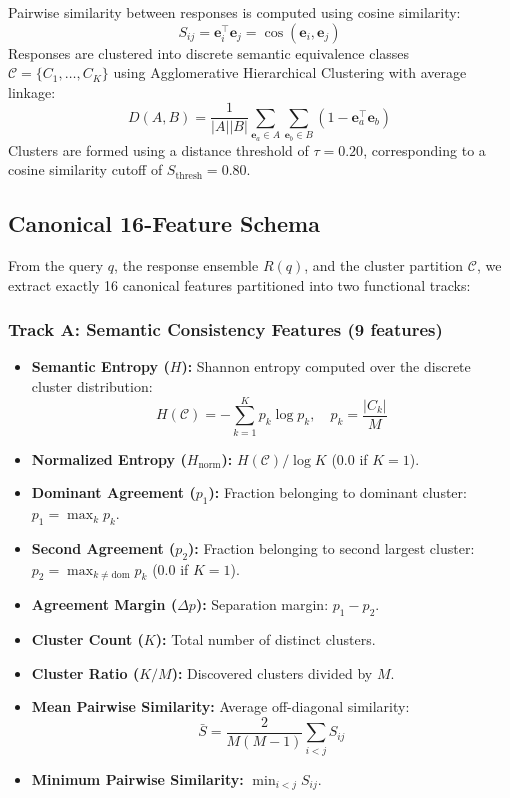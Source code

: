 \documentclass[conference]{IEEEtran}
\begin{document}
Pairwise similarity between responses is computed using cosine similarity:
\begin{equation}
S_{ij} = \mathbf{e}_i^\top \mathbf{e}_j = \cos(\mathbf{e}_i, \mathbf{e}_j)
\end{equation}
Responses are clustered into discrete semantic equivalence classes $\mathcal{C} = \{C_1, \dots, C_K\}$ using Agglomerative Hierarchical Clustering with average linkage:
\begin{equation}
D(A, B) = \frac{1}{|A||B|} \sum_{\mathbf{e}_a \in A} \sum_{\mathbf{e}_b \in B} (1 - \mathbf{e}_a^\top \mathbf{e}_b)
\end{equation}
Clusters are formed using a distance threshold of $\tau = 0.20$, corresponding to a cosine similarity cutoff of $S_{\text{thresh}} = 0.80$.

\subsection{Canonical 16-Feature Schema}
From the query $q$, the response ensemble $R(q)$, and the cluster partition $\mathcal{C}$, we extract exactly 16 canonical features partitioned into two functional tracks:

\subsubsection{Track A: Semantic Consistency Features (9 features)}
\begin{itemize}
    \item \textbf{Semantic Entropy ($H$):} Shannon entropy computed over the discrete cluster distribution:
    \begin{equation}
    H(\mathcal{C}) = -\sum_{k=1}^K p_k \log p_k, \quad p_k = \frac{|C_k|}{M}
    \end{equation}
    \item \textbf{Normalized Entropy ($H_{\text{norm}}$):} $H(\mathcal{C}) / \log K$ (0.0 if $K=1$).
    \item \textbf{Dominant Agreement ($p_1$):} Fraction belonging to dominant cluster: $p_1 = \max_k p_k$.
    \item \textbf{Second Agreement ($p_2$):} Fraction belonging to second largest cluster: $p_2 = \max_{k \neq \text{dom}} p_k$ (0.0 if $K=1$).
    \item \textbf{Agreement Margin ($\Delta p$):} Separation margin: $p_1 - p_2$.
    \item \textbf{Cluster Count ($K$):} Total number of distinct clusters.
    \item \textbf{Cluster Ratio ($K/M$):} Discovered clusters divided by $M$.
    \item \textbf{Mean Pairwise Similarity:} Average off-diagonal similarity:
    \begin{equation}
    \bar{S} = \frac{2}{M(M-1)} \sum_{i < j} S_{ij}
    \end{equation}
    \item \textbf{Minimum Pairwise Similarity:} $\min_{i < j} S_{ij}$.
\end{itemize}
\end{document}
